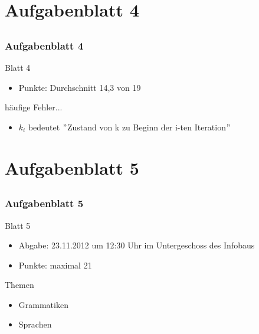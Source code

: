 \section[Blatt 4]{Aufgabenblatt 4}
\subsection*{}
\begin{frame}
	\frametitle{Aufgabenblatt 4}
	\begin{block}{Blatt 4}
		\begin{itemize}
			\item Punkte: Durchschnitt 14,3 von 19
		\end{itemize}
  \end{block}
  
	\begin{block}{häufige Fehler...}
		\begin{itemize}
			\item[4.3:] $k_i$ bedeutet $"$Zustand von k zu Beginn der i-ten Iteration$"$
		 \end{itemize}
	\end{block}
\end{frame}

\section[Blatt 5]{Aufgabenblatt 5}
\subsection*{}
\begin{frame}
	\frametitle{Aufgabenblatt 5}
	\begin{block}{Blatt 5}
		\begin{itemize}
			\item Abgabe: 23.11.2012 um 12:30 Uhr im Untergeschoss des Infobaus
			\item Punkte: maximal 21
		\end{itemize}
  \end{block}
	\begin{block}{Themen}
		\begin{itemize}
	  		\item Grammatiken
	  		\item Sprachen
	  \end{itemize}
	\end{block}
\end{frame}
